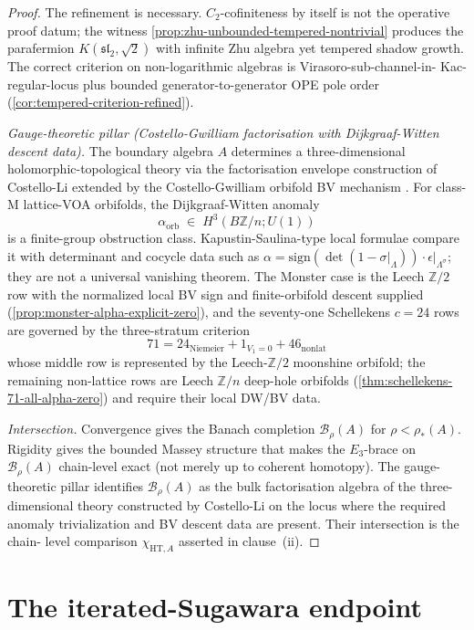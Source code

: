 \begin{proof}
The refinement is necessary. $C_{2}$-cofiniteness by itself is not
the operative proof datum; the witness
\cref{prop:zhu-unbounded-tempered-nontrivial}
produces the parafermion $K(\mathfrak{sl}_{2}, \sqrt{2})$ with
infinite Zhu algebra yet tempered shadow growth. The correct
criterion on non-logarithmic algebras is Virasoro-sub-channel-in-
Kac-regular-locus plus bounded generator-to-generator OPE pole
order (\cref{cor:tempered-criterion-refined}).

\emph{Gauge-theoretic pillar (Costello-Gwilliam factorisation with
Dijkgraaf-Witten descent data).} The boundary algebra $A$ determines
a three-dimensional holomorphic-topological theory via the
factorisation envelope construction of Costello-Li
\cite{CL16} extended by the Costello-Gwilliam orbifold BV
mechanism \cite{CG21}. For class-M lattice-VOA orbifolds, the
Dijkgraaf-Witten anomaly
\[
 \alpha_{\mathrm{orb}} \;\in\; H^{3}(B\mathbb{Z}/n; U(1))
\]
is a finite-group obstruction class. Kapustin-Saulina-type local
formulae compare it with determinant and cocycle data such as
$\alpha = \mathrm{sign}(\det(1 - \sigma \vert_{\Lambda})) \cdot
\epsilon \vert_{\Lambda^{\sigma}}$; they are not a universal
vanishing theorem. The Monster case is the Leech $\mathbb Z/2$ row
with the normalized local BV sign and finite-orbifold descent supplied
(\cref{prop:monster-alpha-explicit-zero}), and the seventy-one
Schellekens $c = 24$ rows are governed by the three-stratum criterion
\[
 71 = 24_{\mathrm{Niemeier}} + 1_{V_1=0} + 46_{\mathrm{nonlat}}
\]
whose middle row is represented by the Leech-$\mathbb{Z}/2$
moonshine orbifold; the remaining non-lattice rows are Leech
$\mathbb{Z}/n$ deep-hole orbifolds
(\cref{thm:schellekens-71-all-alpha-zero}) and require their local
DW/BV data.

\emph{Intersection.} Convergence gives the Banach completion
$\mathcal{B}_{\rho}(A)$ for $\rho < \rho_{*}(A)$.
Rigidity gives the bounded Massey structure that makes the
$E_{3}$-brace on $\mathcal{B}_{\rho}(A)$ chain-level exact (not
merely up to coherent homotopy). The gauge-theoretic pillar
identifies $\mathcal{B}_{\rho}(A)$ as the bulk factorisation
algebra of the three-dimensional theory constructed by
Costello-Li on the locus where the required anomaly trivialization and
BV descent data are present. Their intersection is the chain-
level comparison \(\chi_{\mathrm{HT},A}\) asserted in clause~(ii).
\end{proof}

\section{The iterated-Sugawara endpoint}
\label{sec:climax-w-infty}

